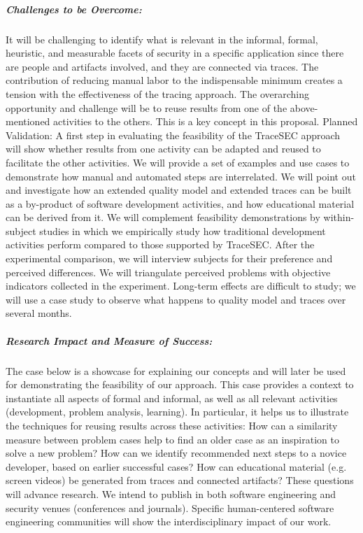 \subparagraph*{Challenges to be Overcome:}
It will be challenging to identify what is relevant in the informal, formal, heuristic, and measurable facets of security in a specific application since there are people and artifacts involved, and they are connected via traces. The contribution of reducing manual labor to the indispensable minimum creates a tension with the effectiveness of the tracing approach. The overarching opportunity and challenge will be to reuse results from one of the above-mentioned activities to the others. This is a key concept in this proposal.
Planned Validation: A first step in evaluating the feasibility of the TraceSEC approach will show whether results from one activity can be adapted and reused to facilitate the other activities. We will provide a set of examples and use cases to demonstrate how manual and automated steps are interrelated. We will point out and investigate how an extended quality model and extended traces can be built as a by-product of software development activities, and how educational material can be derived from it. We will complement feasibility demonstrations by within-subject studies in which we empirically study how traditional develop­ment activities perform compared to those supported by TraceSEC. After the experimental comparison, we will interview subjects for their preference and perceived differences. We will triangulate perceived problems with objective indicators collected in the experiment. Long-term effects are difficult to study; we will use a case study to observe what happens to quality model and traces over several months.

\subparagraph*{Research Impact and Measure of Success:} The case below is a showcase for explaining our concepts and will later be used for demonstrating the feasibility of our approach. This case provides a context to instantiate all aspects of formal and informal, as well as all relevant activities (development, problem analysis, learning). In particular, it helps us to illustrate the techniques for reusing results across these activities: How can a similarity measure between problem cases help to find an older case as an inspiration to solve a new problem? How can we identify recommended next steps to a novice developer, based on earlier successful cases? How can educational material (e.g. screen videos) be generated from traces and connected artifacts? These questions will advance research. We intend to publish in both software engineering and security venues (conferences and journals). Specific human-centered software engineering communities will show the interdisciplinary impact of our work.

